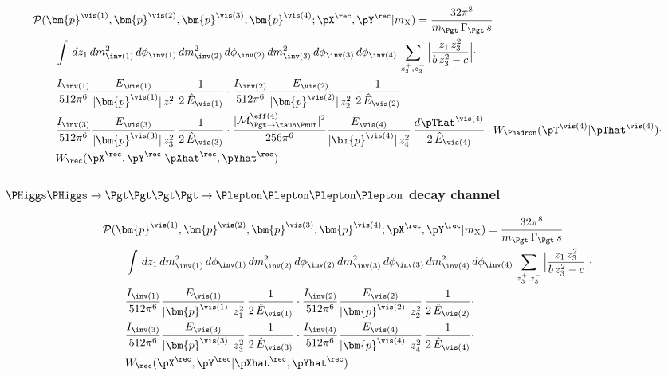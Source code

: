 \begin{align}
&
\mathcal{P}(\bm{p}^{\vis(1)},\bm{p}^{\vis(2)},\bm{p}^{\vis(3)},\bm{p}^{\vis(4)};\pX^{\rec},\pY^{\rec}|m_{\textrm{X}})
= \frac{32\pi^{8}}{m_{\Pgt} \, \Gamma_{\Pgt} \, s} \, \nonumber \\
& \qquad \int \, dz_{1} \, dm^{2}_{\inv(1)} \, d\phi_{\inv(1)} \, dm^{2}_{\inv(2)} \, d\phi_{\inv(2)} \, dm^{2}_{\inv(3)} \, d\phi_{\inv(3)} \, d\phi_{\inv(4)} \, 
  \sum_{z_{3}^{+},z_{3}^{-}} \, \Bigr\lvert \frac{z_{1} \, z_{3}^{2}}{b \, z_{3}^{2} - c} \Bigr\rvert \cdot \nonumber \\
& \qquad \frac{I_{\inv(1)}}{512\pi^{6}} 
  \frac{E_{\vis(1)}}{\vert\bm{p}^{\vis(1)}\vert \, z_{1}^{2}} \, \frac{1}{2 \, \hat{E}_{\vis(1)}} 
  \cdot \frac{I_{\inv(2)}}{512\pi^{6}} 
  \frac{E_{\vis(2)}}{\vert\bm{p}^{\vis(2)}\vert \, z_{2}^{2}} \, \frac{1}{2 \, \hat{E}_{\vis(2)}} \cdot \nonumber \\
& \qquad \frac{I_{\inv(3)}}{512\pi^{6}} 
  \frac{E_{\vis(3)}}{\vert\bm{p}^{\vis(3)}\vert \, z_{3}^{2}} \, \frac{1}{2 \, \hat{E}_{\vis(3)}} 
  \cdot \frac{\vert\mathcal{M}^{\eff(4)}_{\Pgt \to \tauh\Pnut}\vert^{2}}{256\pi^{6}} 
  \frac{E_{\vis(4)}}{\vert\bm{p}^{\vis(4)}\vert \, z_{4}^{2}} \, \frac{d\pThat^{\vis(4)}}{2 \, \hat{E}_{\vis(4)}} 
  \cdot W_{\Phadron}( \pT^{\vis(4)} | \pThat^{\vis(4)} ) \cdot \nonumber \\
& \qquad W_{\rec}( \pX^{\rec},\pY^{\rec} | \pXhat^{\rec},\pYhat^{\rec} ) 
\label{eq:likelihood_lllth}
\end{align}

\subsubsection{$\PHiggs\PHiggs \to \Pgt\Pgt\Pgt\Pgt \to \Plepton\Plepton\Plepton\Plepton$ decay channel}

\begin{align}
&
\mathcal{P}(\bm{p}^{\vis(1)},\bm{p}^{\vis(2)},\bm{p}^{\vis(3)},\bm{p}^{\vis(4)};\pX^{\rec},\pY^{\rec}|m_{\textrm{X}})
= \frac{32\pi^{8}}{m_{\Pgt} \, \Gamma_{\Pgt} \, s} \, \nonumber \\
& \qquad \int \, dz_{1} \, dm^{2}_{\inv(1)} \, d\phi_{\inv(1)} \, dm^{2}_{\inv(2)} \, d\phi_{\inv(2)} \, dm^{2}_{\inv(3)} \, d\phi_{\inv(3)} \, dm^{2}_{\inv(4)} \, d\phi_{\inv(4)} \, 
  \sum_{z_{3}^{+},z_{3}^{-}} \, \Bigr\lvert \frac{z_{1} \, z_{3}^{2}}{b \, z_{3}^{2} - c} \Bigr\rvert \cdot \nonumber \\
& \qquad \frac{I_{\inv(1)}}{512\pi^{6}} 
  \frac{E_{\vis(1)}}{\vert\bm{p}^{\vis(1)}\vert \, z_{1}^{2}} \, \frac{1}{2 \, \hat{E}_{\vis(1)}} 
  \cdot \frac{I_{\inv(2)}}{512\pi^{6}} 
  \frac{E_{\vis(2)}}{\vert\bm{p}^{\vis(2)}\vert \, z_{2}^{2}} \, \frac{1}{2 \, \hat{E}_{\vis(2)}} \cdot \nonumber \\
& \qquad \frac{I_{\inv(3)}}{512\pi^{6}} 
  \frac{E_{\vis(3)}}{\vert\bm{p}^{\vis(3)}\vert \, z_{3}^{2}} \, \frac{1}{2 \, \hat{E}_{\vis(3)}} 
  \cdot \frac{I_{\inv(4)}}{512\pi^{6}} 
  \frac{E_{\vis(4)}}{\vert\bm{p}^{\vis(4)}\vert \, z_{4}^{2}} \, \frac{1}{2 \, \hat{E}_{\vis(4)}} \cdot \nonumber \\
& \qquad W_{\rec}( \pX^{\rec},\pY^{\rec} | \pXhat^{\rec},\pYhat^{\rec} ) 
\label{eq:likelihood_llll}
\end{align}
